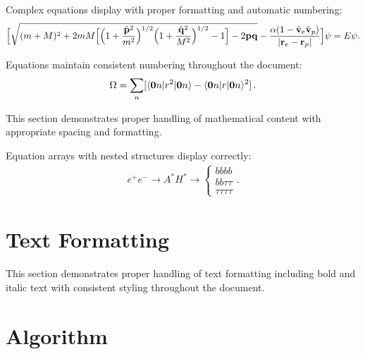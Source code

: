 \documentclass{article}
\begin{document}
Complex equations display with proper formatting and automatic numbering:
\begin{equation}\label{5}
  \Bigl[\sqrt{(m+M)^2 +2mM\Bigl[\Bigl(1+\frac{{\hat {\bf p}^2}}{m^2}\Bigr)^{1/2}\Bigl(1+\frac{{\hat {\bf q}^2}}{M^2}\Bigr)^{1/2}-1\Bigr]
    -2{\bf p}{\bf q}}-\frac{\alpha(1-{\hat {\bf v}_{e}}{\hat {\bf v}_{p}})}{\vert {\bf r}_{e}-{\bf r}_{p} \vert}\Bigr]\psi=E\psi.
\end{equation}

Equations maintain consistent numbering throughout the document:
\begin{equation}
\Omega = \sum_n [ \langle {\bf 0}n| r^2 |{\bf 0}n \rangle -
\langle {\bf 0}n| r |{\bf 0}n \rangle^2]\,.
\end{equation}

This section demonstrates proper handling of mathematical content with appropriate spacing and formatting.

Equation arrays with nested structures display correctly:
\begin{eqnarray}
  e^+e^- \rightarrow A^* H^* \rightarrow
  \left\{ \begin{array}{l}
    bbbb \\
    bb\tau\tau \\
    \tau\tau\tau\tau
    \end{array} \right. .
\end{eqnarray}

\section{Text Formatting}

This section demonstrates proper handling of text formatting including bold and italic text with consistent styling throughout the document.

\section{Algorithm}
\end{document}

